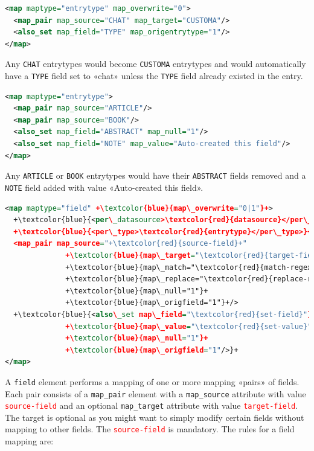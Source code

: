 \documentclass{ltxdockit}
\begin{document}
\begin{lstlisting}[language=xml,escapechar=+,mathescape=true]
<map maptype="entrytype" map_overwrite="0">
  <map_pair map_source="CHAT" map_target="CUSTOMA"/>
  <also_set map_field="TYPE" map_origentrytype="1"/>
</map>
\end{lstlisting}

\noindent Any \verb+CHAT+ entrytypes would become \verb+CUSTOMA+ entrytypes and 
would automatically have a \verb+TYPE+ field set to 
«chat» unless the \verb+TYPE+ field already existed in the entry.

\begin{lstlisting}[language=xml,escapechar=+,mathescape=true]
<map maptype="entrytype">
  <map_pair map_source="ARTICLE"/>
  <map_pair map_source="BOOK"/>
  <also_set map_field="ABSTRACT" map_null="1"/>
  <also_set map_field="NOTE" map_value="Auto-created this field"/>
</map>
\end{lstlisting}

\noindent Any \verb+ARTICLE+ or \verb+BOOK+ entrytypes would have their \verb+ABSTRACT+
fields removed and a \verb+NOTE+ field added with value «Auto-created this field».
\bigskip
{}

\begin{lstlisting}[language=xml,escapechar=+,mathescape=true]
<map maptype="field" +\textcolor{blue}{map\_overwrite="0|1"}+>
  +\textcolor{blue}{<per\_datasource>\textcolor{red}{datasource}</per\_datasource>}+
  +\textcolor{blue}{<per\_type>\textcolor{red}{entrytype}</per\_type>}+
  <map_pair map_source="+\textcolor{red}{source-field}+"
              +\textcolor{blue}{map\_target="\textcolor{red}{target-field}"}+/>
              +\textcolor{blue}{map\_match="\textcolor{red}{match-regexp}"}+
              +\textcolor{blue}{map\_replace="\textcolor{red}{replace-regexp}"}+
              +\textcolor{blue}{map\_null="1"}+
              +\textcolor{blue}{map\_origfield="1"}+/>
  +\textcolor{blue}{<also\_set map\_field="\textcolor{red}{set-field}"}+
              +\textcolor{blue}{map\_value="\textcolor{red}{set-value}"}+
              +\textcolor{blue}{map\_null="1"}+
              +\textcolor{blue}{map\_origfield="1"/>}+
</map>
\end{lstlisting}

\noindent A \verb+field+ element performs a mapping of one or more
mapping «pairs» of fields. Each pair consists of a \verb+map_pair+ element with a
\verb+map_source+ attribute with value \textcolor{red}{\texttt{source-field}} and an optional
\verb+map_target+ attribute with
value \textcolor{red}{\texttt{target-field}}. The target is optional as
you might want to simply modify certain fields without mapping to other fields.
The \textcolor{red}{\texttt{source-field}} is
mandatory. The rules for a field mapping are:\\[1ex]
\end{document}
